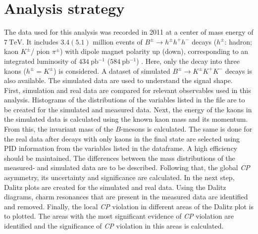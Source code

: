 \section{Analysis strategy}
\label{sec:Analysis_strategy}
The data used for this analysis was recorded in 2011 at a center of mass energy of $\qty{7}{\tera\eV}$. It includes $\num{3.4}(\num{5.1})$ million events of 
$B^{\pm} \to h^{\pm} h^+ h^-$ decays ($h^{\pm}$: hadron; kaon $K^{\pm}$/ pion {$\pi^{\pm}$}) with dipole magnet polarity up (down), 
corresponding to an integrated luminosity of $\qty{434}{\pico\barn^{-1}}$ ($\qty{584}{\pico\barn^{-1}}$) \cite{LHCb_CPV}. 
Here, only the decay into three kaons ($h^{\pm} =  K^{\pm}$) is considered.
A dataset of simulated $B^{\pm} \to K^{\pm} K^+ K^-$ decays is also available. The simulated data are used to understand the signal shape.\\
First, simulation and real data are compared for relevant observables used in this analysis.
Histograms of the distributions of the variables listed in the file are to be created for the simulated and measured data.
Next, the energy of the kaons in the simulated data is calculated using the known kaon mass and its momentum. From this, the invariant mass of the $B$-mesons is calculated.
The same is done for the real data after decays with only kaons in the final state are selected using PID information from the variables listed in the dataframe. 
A high efficiency should be maintained. The differences between the mass distributions of the measured- and simulated data are to be described.
Following that, the global \textit{CP} asymmetry, its uncertainty and significance are calculated.
In the next step, Dalitz plots are created for the simulated and real data. Using the Dalitz diagrams, charm resonances that are present in the measured data are 
identified and removed. Finally, the local \textit{CP} violation in different areas of the Dalitz plot is to plotted. The areas with the most significant evidence of \textit{CP} violation 
are identified and the significance of \textit{CP} violation in this areas is calculated. 
